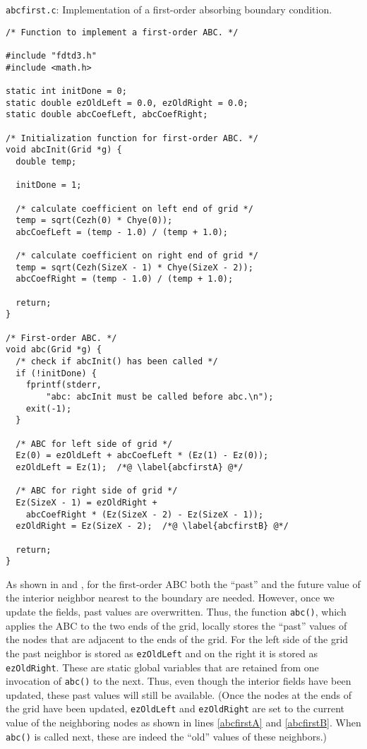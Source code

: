 \begin{program}
{\tt abcfirst.c}: Implementation of a first-order absorbing boundary
condition. 
\label{pro:abcfirst}
\codemiddle
\begin{lstlisting}
/* Function to implement a first-order ABC. */

#include "fdtd3.h"
#include <math.h>

static int initDone = 0;
static double ezOldLeft = 0.0, ezOldRight = 0.0;
static double abcCoefLeft, abcCoefRight;

/* Initialization function for first-order ABC. */
void abcInit(Grid *g) {
  double temp;
  
  initDone = 1;

  /* calculate coefficient on left end of grid */
  temp = sqrt(Cezh(0) * Chye(0));
  abcCoefLeft = (temp - 1.0) / (temp + 1.0);

  /* calculate coefficient on right end of grid */
  temp = sqrt(Cezh(SizeX - 1) * Chye(SizeX - 2));
  abcCoefRight = (temp - 1.0) / (temp + 1.0);

  return;
}

/* First-order ABC. */
void abc(Grid *g) {
  /* check if abcInit() has been called */
  if (!initDone) {
    fprintf(stderr,
	    "abc: abcInit must be called before abc.\n");
    exit(-1);
  }

  /* ABC for left side of grid */
  Ez(0) = ezOldLeft + abcCoefLeft * (Ez(1) - Ez(0));
  ezOldLeft = Ez(1);  /*@ \label{abcfirstA} @*/

  /* ABC for right side of grid */
  Ez(SizeX - 1) = ezOldRight + 
    abcCoefRight * (Ez(SizeX - 2) - Ez(SizeX - 1));
  ezOldRight = Ez(SizeX - 2);  /*@ \label{abcfirstB} @*/

  return;
}
\end{lstlisting}
\end{program}

As shown in  and ,
for the first-order ABC both the ``past'' and the future value of the
interior neighbor nearest to the boundary are needed.  However, once
we update the fields, past values are overwritten.  Thus, the function
{\tt abc()}, which applies the ABC to the two ends of the grid,
locally stores the ``past'' values of the nodes that are adjacent to
the ends of the grid.  For the left side of the grid the past neighbor
is stored as {\tt ezOldLeft} and on the right it is stored as {\tt
  ezOldRight}.  These are static global variables that are retained
from one invocation of {\tt abc()} to the next.  Thus, even though the
interior fields have been updated, these past values will still be
available.  (Once the nodes at the ends of the grid have been updated,
{\tt ezOldLeft} and {\tt ezOldRight} are set to the current value of
the neighboring nodes as shown in lines \ref{abcfirstA} and
\ref{abcfirstB}.  When {\tt abc()} is called next, these are indeed
the ``old'' values of these neighbors.)

